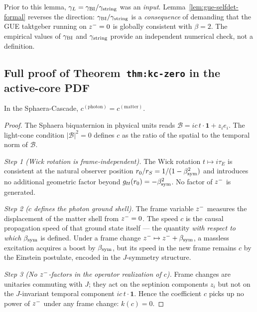 \begin{remark}
Prior to this lemma, $\gamma_L=\gamma_{\mathrm{BI}}/\gamma_{\mathrm{string}}$ was an \emph{input}.
Lemma~\ref{lem:gue-selfdet-formal} reverses the direction:
$\gamma_{\mathrm{BI}}/\gamma_{\mathrm{string}}$ is a \emph{consequence} of demanding that the GUE
taktgeber running on $z^-=0$ is globally consistent with $\beta=2$.
The empirical values of $\gamma_{\mathrm{BI}}$ and $\gamma_{\mathrm{string}}$ provide an independent
numerical check, not a definition.
\end{remark}

\subsection*{Full proof of Theorem~\texttt{thm:kc-zero} in the active-core PDF}
\label{app:kc-zero}

\begin{proposition}[Historical $k(c)=0$ from biquaternion structure --- formal version]
In the Sphaera-Cascade, $c^{(\mathrm{photon})}=c^{(\mathrm{matter})}$.
\end{proposition}

\begin{proof}
The Sphaera biquaternion in physical units reads
$\mathcal{B} = ic\,t\cdot\mathbf{1}+z_i e_i$.
The light-cone condition $|\mathcal{B}|^2=0$ defines $c$ as the ratio
of the spatial to the temporal norm of $\mathcal{B}$.

\emph{Step 1 (Wick rotation is frame-independent).}
The Wick rotation $t\mapsto i\tau_E$ is consistent at the natural
observer position $r_0/r_S=1/(1-\beta_{\mathrm{sym}}^2)$ and introduces no additional
geometric factor beyond $g_{tt}(r_0)=-\beta_{\mathrm{sym}}^2$.
No factor of $z^-$ is generated.

\emph{Step 2 ($c$ defines the photon ground shell).}
The frame variable $z^-$ measures the displacement of the matter
shell from $z^-=0$.
The speed $c$ is the causal propagation speed of that ground state
itself --- the quantity \emph{with respect to which} $\beta_{\mathrm{sym}}$ is defined.
Under a frame change $z^-\mapsto z^-+\beta_{\mathrm{sym}}$, a massless excitation
acquires a boost by $\beta_{\mathrm{sym}}$, but its speed in the new frame remains $c$
by the Einstein postulate, encoded in the $J$-symmetry structure.

\emph{Step 3 (No $z^-$-factors in the operator realization of $c$).}
Frame changes are unitaries commuting with $J$; they act on the septinion
components $z_i$ but not on the $J$-invariant temporal component
$ic\,t\cdot\mathbf{1}$.
Hence the coefficient $c$ picks up no power of $z^-$ under any
frame change: $k(c)=0$.
\end{proof}

